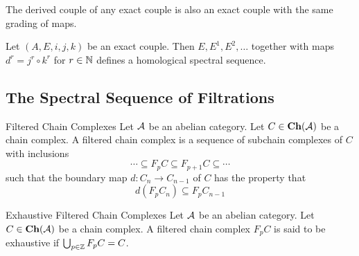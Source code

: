 \documentclass[a4paper]{article}
\begin{document}
\begin{thm}{}{} The derived couple of any exact couple is also an exact couple with the same grading of maps. 
\end{thm}

\begin{thm}{}{} Let $(A,E,i,j,k)$ be an exact couple. Then $E,E^1,E^2,\dots$ together with maps $d^r=j^r\circ k^r$ for $r\in\mathbb{N}$ defines a homological spectral sequence. 
\end{thm}

\subsection{The Spectral Sequence of Filtrations}
\begin{defn}{Filtered Chain Complexes}{} Let $\mathcal{A}$ be an abelian category. Let $C\in\bold{Ch}(\mathcal{A})$ be a chain complex. A filtered chain complex is a sequence of subchain complexes of $C$ with inclusions $$\cdots\subseteq F_pC\subseteq F_{p+1}C\subseteq\cdots$$ such that the boundary map $d:C_n\to C_{n-1}$ of $C$ has the property that $$d(F_pC_n)\subseteq F_pC_{n-1}$$
\end{defn}

\begin{defn}{Exhaustive Filtered Chain Complexes}{} Let $\mathcal{A}$ be an abelian category. Let $C\in\bold{Ch}(\mathcal{A})$ be a chain complex. A filtered chain complex $F_pC$ is said to be exhaustive if $\bigcup_{p\in\mathbb{Z}}F_pC=C$. 
\end{defn}
\end{document}
